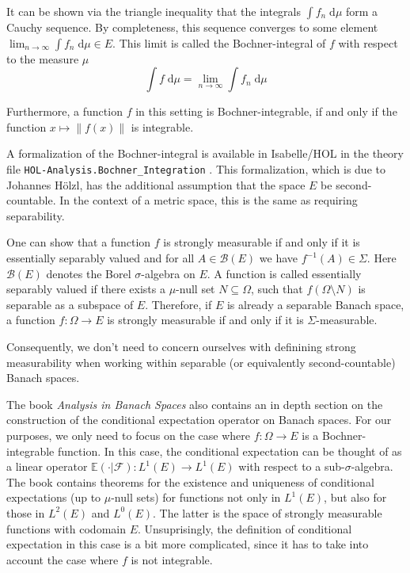 It can be shown via the triangle inequality that the integrals $\int f_n\; \textrm{d}\mu$ form a Cauchy sequence. By completeness, this sequence converges to some element $\lim_{n \to \infty} \int f_n \; \textrm{d}\mu \in E$. This limit is called the Bochner-integral of $f$ with respect to the measure $\mu$
\[
	\int f \; \textrm{d}\mu = \lim_{n \to \infty} \int f_n \; \textrm{d}\mu
\]

Furthermore, a function $f$ in this setting is Bochner-integrable, if and only if the function $x \mapsto \lVert f(x) \rVert$ is integrable.

\vspace{0.3cm}
\relax
{}\relax

A formalization of the Bochner-integral is available in Isabelle/HOL in the theory file \texttt{HOL-Analysis.Bochner\_Integration} \cite{hoelzl2011measuretheory}. This formalization, which is due to Johannes Hölzl, has the additional assumption that the space $E$ be second-countable. In the context of a metric space, this is the same as requiring separability.
\vspace{0.3cm}
\begin{remark}

One can show that a function $f$ is strongly measurable if and only if it is essentially separably valued and for all $A \in \mathcal{B}(E)$ we have $f^{-1}(A) \in \Sigma$. Here $\mathcal{B}(E)$ denotes the Borel $\sigma$-algebra on $E$. A function is called essentially separably valued if there exists a $\mu$-null set $N \subseteq \Omega$, such that $f (\Omega \setminus N)$ is separable as a subspace of $E$. Therefore, if $E$ is already a separable Banach space, a function $f : \Omega \rightarrow E$ is strongly measurable if and only if it is $\Sigma$-measurable.

Consequently, we don't need to concern ourselves with definining strong measurability when working within separable (or equivalently second-countable) Banach spaces.
\end{remark}
\vspace{0.3cm}

The book \textit{Analysis in Banach Spaces} also contains an in depth section on the construction of the conditional expectation operator on Banach spaces. For our purposes, we only need to focus on the case where $f : \Omega \rightarrow E$ is a Bochner-integrable function. In this case, the conditional expectation can be thought of as a linear operator $\mathbb{E}(\cdot\vert\mathcal{F}) : L^1(E) \rightarrow L^1(E)$ with respect to a sub-$\sigma$-algebra. The book contains theorems for the existence and uniqueness of conditional expectations (up to $\mu$-null sets) for functions not only in $L^1(E)$, but also for those in $L^2(E)$ and $L^0(E)$. The latter is the space of strongly measurable functions with codomain $E$. Unsuprisingly, the definition of conditional expectation in this case is a bit more complicated, since it has to take into account the case where $f$ is not integrable.

